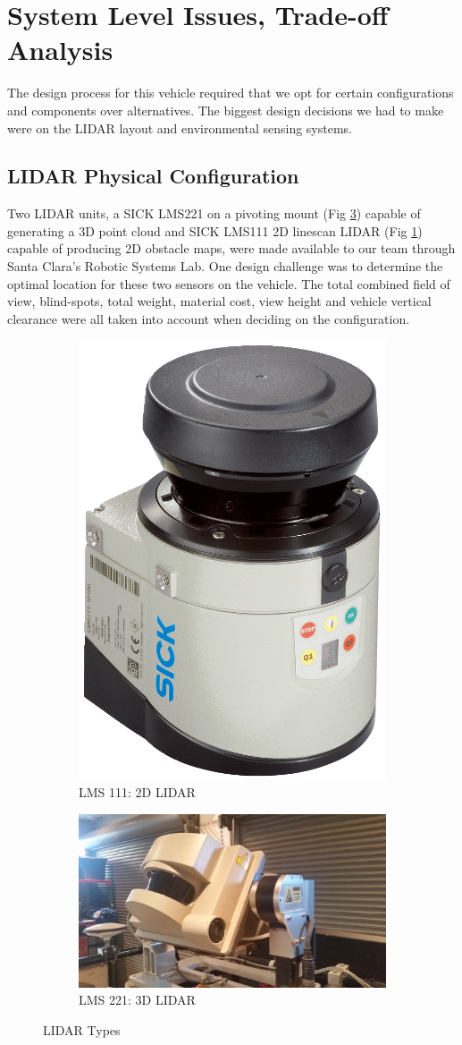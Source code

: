 \section{System Level Issues, Trade-off Analysis}
The design process for this vehicle required that we opt for certain configurations and components over alternatives. The biggest design decisions we had to make were on the LIDAR layout and environmental sensing systems.\\

\subsection{LIDAR Physical Configuration}

Two LIDAR units, a SICK LMS221 on a pivoting mount (Fig \ref{fig:lms221A}) capable of generating a 3D point cloud and SICK LMS111 2D linescan LIDAR (Fig \ref{fig:lms111A}) capable of producing 2D obstacle maps, were made available to our team through Santa Clara's  Robotic Systems Lab. One design challenge was to determine the optimal location for these two sensors on the vehicle. The total combined field of view, blind-spots, total weight, material cost, view height and vehicle vertical clearance were all taken into account when deciding on the configuration. 

\begin{figure}[H]
\centering
\begin{subfigure}{.5\textwidth}
  \centering
  \includegraphics[height=.5\linewidth]{LMS111}
  \caption{LMS 111: 2D LIDAR}
  \label{fig:lms111A}
\end{subfigure}%
\begin{subfigure}{.5\textwidth}
  \centering
  \includegraphics[height=.5\linewidth]{LMS221}
  \caption{LMS 221: 3D LIDAR}
  \label{fig:lms221A}
\end{subfigure}
\caption{LIDAR Types}
\end{figure}


